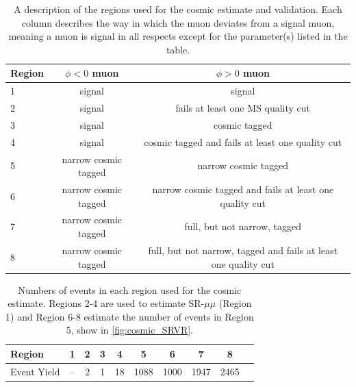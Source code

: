 \begin{table}
\centering
\begin{tabular}{l|c|c}
Region & $\phi < 0$ muon & $\phi > 0$ muon \\
\hline
1 & signal & signal\\ 
2 & signal & fails at least one MS quality cut\\ 
3 & signal & cosmic tagged \\ 
4 & signal & cosmic tagged and fails at least one quality cut\\ 
5 & narrow cosmic tagged & narrow cosmic tagged\\ 
6 & narrow cosmic tagged & narrow cosmic tagged and fails at least one quality cut\\ 
7 & narrow cosmic tagged & full, but not narrow, tagged \\ 
8 & narrow cosmic tagged & full, but not narrow, tagged and fails at least one quality cut\\  
\hline
\end{tabular}
\caption{A description of the regions used for the cosmic estimate and validation. Each column describes the way in which the muon deviates from a signal muon, meaning a muon is signal in all respects except for the parameter(s) listed in the table.}
\label{tab:cosmic_SRVR}
\end{table}


\begin{table}
\centering
\begin{tabular}{lccccccccc}
Region & 1    & 2 & 3 & 4 & 5 & 6 & 7 & 8\\
\hline
Event Yield & --  & 2 & 1 & 18 & 1088 & 1000 & 1947 & 2465 \\
\hline
\end{tabular}
\caption{Numbers of events in each region used for the cosmic estimate. Regions 2-4 are used to estimate SR-$\mu\mu$ (Region 1) and Region 6-8 estimate the number of events in Region 5, show in \autoref{fig:cosmic_SRVR}.}
\label{tab:estimate_counts}
\end{table}


